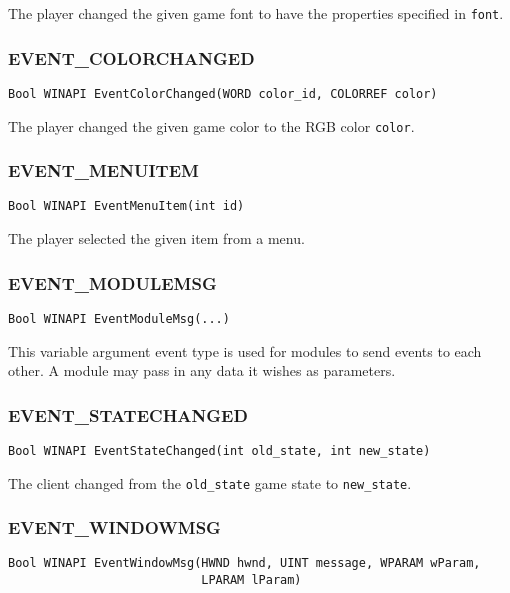 The player changed the given game font to have the properties
specified in {\tt font}.

\subsubsection{EVENT\_COLORCHANGED}
\begin{verbatim}
Bool WINAPI EventColorChanged(WORD color_id, COLORREF color)
\end{verbatim}

The player changed the given game color to the RGB color {\tt color}.

\subsubsection{EVENT\_MENUITEM}
\begin{verbatim}
Bool WINAPI EventMenuItem(int id)
\end{verbatim}

The player selected the given item from a menu.

\subsubsection{EVENT\_MODULEMSG}
\begin{verbatim}
Bool WINAPI EventModuleMsg(...)
\end{verbatim}

This variable argument event type is used for modules to send events
to each other.  A module may pass in any data it wishes as parameters.

\subsubsection{EVENT\_STATECHANGED}
\begin{verbatim}
Bool WINAPI EventStateChanged(int old_state, int new_state)
\end{verbatim}

The client changed from the {\tt old\_state} game state to {\tt new\_state}.

\subsubsection{EVENT\_WINDOWMSG}
\begin{verbatim}
Bool WINAPI EventWindowMsg(HWND hwnd, UINT message, WPARAM wParam,
                           LPARAM lParam)
\end{verbatim}

